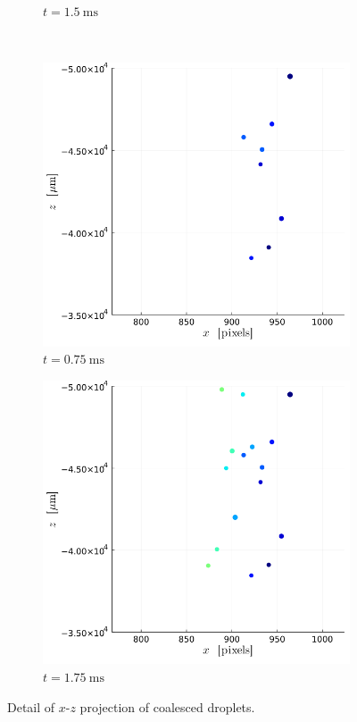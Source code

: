 \begin{figure}[H]
\begin{subfigure}[t]{0.32\linewidth}
        \caption*{$t = \SI{1.5}{\ms}$}
    \end{subfigure}
    \\
    \begin{subfigure}[t]{0.32\linewidth}
        \includegraphics[width=\linewidth]{./Figure/4_Results/exp/xz_detailed_view/out0004.png}
        \caption*{$t = \SI{0.75}{\ms}$}
    \end{subfigure}
    \begin{subfigure}[t]{0.32\linewidth}
        \includegraphics[width=\linewidth]{./Figure/4_Results/exp/xz_detailed_view/out0008.png}
        \caption*{$t = \SI{1.75}{\ms}$}
    \end{subfigure}

    \caption{Detail of $x$-$z$ projection of coalesced droplets.}
    \label{fig:xz_detailed_view}
\end{figure}

